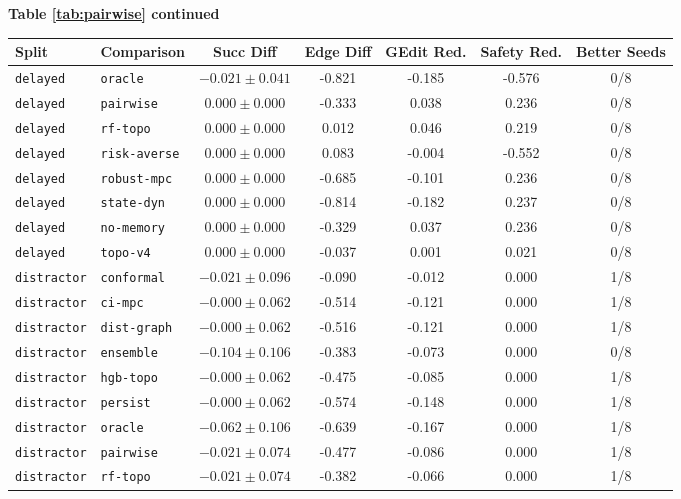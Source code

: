 \documentclass{article}
\begin{document}
\begin{center}
\textbf{Table \ref{tab:pairwise} continued}\\[0.4ex]
\begin{tabular}{llccccc}
\toprule
Split & Comparison & Succ Diff & Edge Diff & GEdit Red. & Safety Red. & Better Seeds \\
\midrule
\texttt{delayed} & \texttt{oracle} & $-0.021 \pm 0.041$ & -0.821 & -0.185 & -0.576 & 0/8 \\
\texttt{delayed} & \texttt{pairwise} & $0.000 \pm 0.000$ & -0.333 & 0.038 & 0.236 & 0/8 \\
\texttt{delayed} & \texttt{rf-topo} & $0.000 \pm 0.000$ & 0.012 & 0.046 & 0.219 & 0/8 \\
\texttt{delayed} & \texttt{risk-averse} & $0.000 \pm 0.000$ & 0.083 & -0.004 & -0.552 & 0/8 \\
\texttt{delayed} & \texttt{robust-mpc} & $0.000 \pm 0.000$ & -0.685 & -0.101 & 0.236 & 0/8 \\
\texttt{delayed} & \texttt{state-dyn} & $0.000 \pm 0.000$ & -0.814 & -0.182 & 0.237 & 0/8 \\
\texttt{delayed} & \texttt{no-memory} & $0.000 \pm 0.000$ & -0.329 & 0.037 & 0.236 & 0/8 \\
\texttt{delayed} & \texttt{topo-v4} & $0.000 \pm 0.000$ & -0.037 & 0.001 & 0.021 & 0/8 \\
\texttt{distractor} & \texttt{conformal} & $-0.021 \pm 0.096$ & -0.090 & -0.012 & 0.000 & 1/8 \\
\texttt{distractor} & \texttt{ci-mpc} & $-0.000 \pm 0.062$ & -0.514 & -0.121 & 0.000 & 1/8 \\
\texttt{distractor} & \texttt{dist-graph} & $-0.000 \pm 0.062$ & -0.516 & -0.121 & 0.000 & 1/8 \\
\texttt{distractor} & \texttt{ensemble} & $-0.104 \pm 0.106$ & -0.383 & -0.073 & 0.000 & 0/8 \\
\texttt{distractor} & \texttt{hgb-topo} & $-0.000 \pm 0.062$ & -0.475 & -0.085 & 0.000 & 1/8 \\
\texttt{distractor} & \texttt{persist} & $-0.000 \pm 0.062$ & -0.574 & -0.148 & 0.000 & 1/8 \\
\texttt{distractor} & \texttt{oracle} & $-0.062 \pm 0.106$ & -0.639 & -0.167 & 0.000 & 1/8 \\
\texttt{distractor} & \texttt{pairwise} & $-0.021 \pm 0.074$ & -0.477 & -0.086 & 0.000 & 1/8 \\
\texttt{distractor} & \texttt{rf-topo} & $-0.021 \pm 0.074$ & -0.382 & -0.066 & 0.000 & 1/8 \\

\end{tabular}
\end{center}
\end{document}
